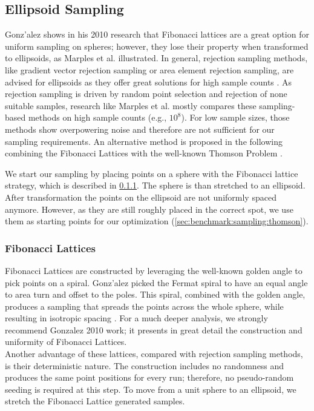 \subsection{Ellipsoid Sampling} \label{sec:benchmark:sampling}
Gonz{'a}lez shows in his 2010 research \cite{gonzalez_2010} that Fibonacci lattices are a great option for uniform sampling on spheres; however, they lose their property when transformed to ellipsoids, as Marples et al. \cite{marples_2024} illustrated.
In general, rejection sampling methods, like gradient vector rejection sampling or area element rejection sampling, are advised for ellipsoids as they offer great solutions for high sample counts \cite{marples_2024,williamson_1987,melfi_2004}.
As rejection sampling is driven by random point selection and rejection of none suitable samples, research like Marples et al. \cite{marples_2024} mostly compares these sampling-based methods on high sample counts (e.g., $10^{8}$).
For low sample sizes, those methods show overpowering noise and therefore are not sufficient for our sampling requirements.
An alternative method is proposed in the following combining the Fibonacci Lattices \cite{gonzalez_2010} with the well-known Thomson Problem \cite{thomson_1904}.
\par
We start our sampling by placing points on a sphere with the Fibonacci lattice strategy, which is described in \cref{sec:benchmark:sampling:fibonacci}.
The sphere is than stretched to an ellipsoid.
After transformation the points on the ellipsoid are not uniformly spaced anymore.
However, as they are still roughly placed in the correct spot, we use them as starting points for our optimization (\cref{sec:benchmark:sampling:thomson}).

\subsubsection{Fibonacci Lattices} \label{sec:benchmark:sampling:fibonacci}
Fibonacci Lattices are constructed by leveraging the well-known golden angle to pick points on a spiral.
Gonz{'a}lez picked the Fermat spiral \cite{vogel_1979} to have an equal angle to area turn and offset to the poles.
This spiral, combined with the golden angle, produces a sampling that spreads the points across the whole sphere, while resulting in isotropic spacing \cite{gonzalez_2010}.
For a much deeper analysis, we strongly recommend Gonzalez 2010 work; it presents in great detail the construction and uniformity of Fibonacci Lattices. \\
Another advantage of these lattices, compared with rejection sampling methods, is their deterministic nature.
The construction includes no randomness and produces the same point positions for every run; therefore, no pseudo-random seeding is required at this step.
To move from a unit sphere to an ellipsoid, we stretch the Fibonacci Lattice generated samples.

